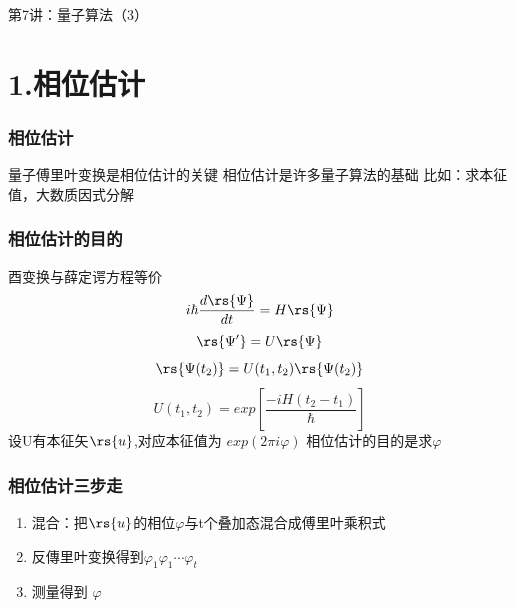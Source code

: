 

\begin{frame} [plain]
    \frametitle{}
    \Background[1] 
    \begin{center}
    {\huge 第7讲：量子算法（3）    }
    \end{center}  
    \addtocounter{framenumber}{-1}   
\end{frame}

\section{1.相位估计}

\begin{frame}
    \frametitle{相位估计}
    \begin{itemize}
        \Item 量子傅里叶变换是相位估计的关键
        \Item 相位估计是许多量子算法的基础
        \Item 比如：求本征值，大数质因式分解
    \end{itemize}
\end{frame}

\begin{frame}
    \frametitle{相位估计的目的}
    \begin{itemize}
        \Item 酉变换与薛定谔方程等价
        \[ i\hbar \frac{d\rs{\Psi}}{dt}=H \rs{\Psi}\]
        \[\rs{\Psi'}=U\rs{\Psi}\]
        \[\rs{\Psi(t_2)} =U(t_1,t_2) \rs{\Psi(t_2)}\]
        \[U(t_1,t_2) = exp[\frac{-iH(t_2-t_1)}{\hbar}]\]
        \Item 设U有本征矢$\rs{u}$,对应本征值为 $exp(2\pi i \varphi)$
        \Item 相位估计的目的是求$\varphi$
    \end{itemize}
\end{frame}

\begin{frame}
    \frametitle{相位估计三步走}
    \begin{enumerate}
        \item 混合：把$\rs{u}$的相位$\varphi$与t个叠加态混合成傅里叶乘积式
        \item 反傳里叶变换得到$\varphi_1 \varphi_1 \cdots\varphi_t$
        \item 测量得到 $\varphi$
    \end{enumerate}
\end{frame}

